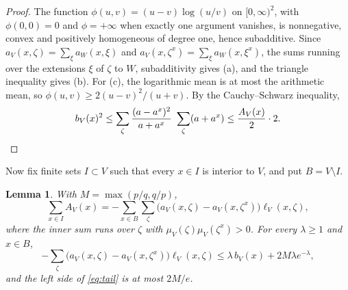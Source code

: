 \documentclass[11pt]{amsart}
\newtheorem{lemma}[theorem]{Lemma}
\theoremstyle{remark}
\begin{document}
\begin{proof}
The function $\phi(u,v)=(u-v)\log(u/v)$ on $[0,\infty)^2$, with $\phi(0,0)=0$ and $\phi=+\infty$ when exactly one
argument vanishes, is nonnegative, convex and positively homogeneous of degree one, hence subadditive. Since
$a_V(x,\zeta)=\sum_\xi a_W(x,\xi)$ and $a_V(x,\zeta^x)=\sum_\xi a_W(x,\xi^x)$, the sums running over the extensions
$\xi$ of $\zeta$ to $W$, subadditivity gives (a), and the triangle inequality gives (b). For (c), the logarithmic mean
is at most the arithmetic mean, so $\phi(u,v)\ge2(u-v)^2/(u+v)$. By the Cauchy--Schwarz inequality,
\[
b_V(x)^2\le\sum_\zeta\frac{(a-a^x)^2}{a+a^x}\ \sum_\zeta(a+a^x)\le\frac{A_V(x)}2\cdot2 .\qedhere
\]
\end{proof}

Now fix finite sets $I\subset V$ such that every $x\in I$ is interior to $V$, and put $B=V\setminus I$.

\begin{lemma}\label{lem:balance}
With $M=\max(p/q,q/p)$,
\begin{equation}\label{eq:balance}
\sum_{x\in I}A_V(x)=-\sum_{x\in B}\sum_\zeta\bigl(a_V(x,\zeta)-a_V(x,\zeta^x)\bigr)\ell_V(x,\zeta),
\end{equation}
where the inner sum runs over $\zeta$ with $\mu_V(\zeta)\mu_V(\zeta^x)>0$. For every $\lambda\ge1$ and $x\in B$,
\begin{equation}\label{eq:tail}
-\sum_\zeta\bigl(a_V(x,\zeta)-a_V(x,\zeta^x)\bigr)\ell_V(x,\zeta)\le\lambda\,b_V(x)+2M\lambda e^{-\lambda},
\end{equation}
and the left side of \eqref{eq:tail} is at most $2M/e$.
\end{lemma}
\end{document}
